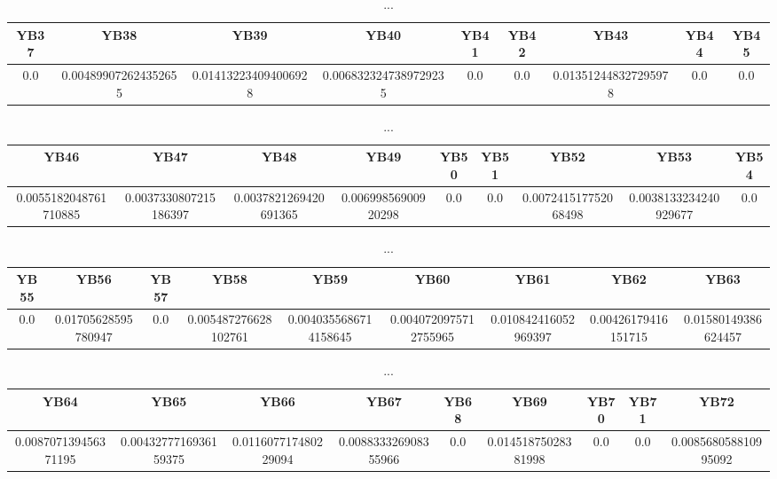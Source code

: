 \documentclass[]{article}
\begin{document}
\begin{table}[h]
      \centering
      \begin{tabular}{|c|c|c|c|c|c|c|c|c|}
            \hline
            YB37 & YB38                 & YB39                 & YB40                  & YB41 & YB42 & YB43                 & YB44 & YB45 \\
            \hline
            0.0  & 0.004899072624352655 & 0.014132234094006928 & 0.0068323247389729235 & 0.0  & 0.0  & 0.013512448327295978 & 0.0  & 0.0  \\
            \hline
      \end{tabular}
      \caption{...}
\end{table}
\begin{table}[h]
      \centering
      \begin{tabular}{|c|c|c|c|c|c|c|c|c|}
            \hline
            YB46                  & YB47                  & YB48                  & YB49                & YB50 & YB51 & YB52                 & YB53                  & YB54 \\
            \hline
            0.0055182048761710885 & 0.0037330807215186397 & 0.0037821269420691365 & 0.00699856900920298 & 0.0  & 0.0  & 0.007241517752068498 & 0.0038133234240929677 & 0.0  \\
            \hline
      \end{tabular}
      \caption{...}
\end{table}
\begin{table}[h]
      \centering
      \begin{tabular}{|c|c|c|c|c|c|c|c|c|}
            \hline
            YB55 & YB56                & YB57 & YB58                 & YB59                  & YB60                  & YB61                 & YB62                & YB63                \\
            \hline
            0.0  & 0.01705628595780947 & 0.0  & 0.005487276628102761 & 0.0040355686714158645 & 0.0040720975712755965 & 0.010842416052969397 & 0.00426179416151715 & 0.01580149386624457 \\
            \hline
      \end{tabular}
      \caption{...}
\end{table}
\begin{table}[h]
      \centering
      \begin{tabular}{|c|c|c|c|c|c|c|c|c|}
            \hline
            YB64                 & YB65                  & YB66                 & YB67                 & YB68 & YB69                & YB70 & YB71 & YB72                 \\
            \hline
            0.008707139456371195 & 0.0043277716936159375 & 0.011607717480229094 & 0.008833326908355966 & 0.0  & 0.01451875028381998 & 0.0  & 0.0  & 0.008568058810995092 \\
            \hline
      \end{tabular}
      \caption{...}
\end{table}
\end{document}
